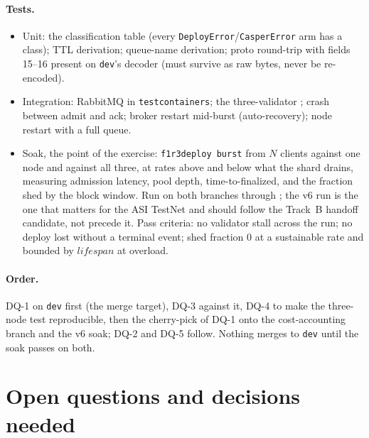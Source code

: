 \documentclass[11pt]{article}
\newcommand{\code}[1]{\texttt{#1}}
\newcommand{\dev}{\code{dev}}
\begin{document}
\paragraph{Tests.}
\begin{itemize}[leftmargin=2em]
  \item Unit: the classification table (every \code{DeployError}/\code{CasperError}
    arm has a class); TTL derivation; queue-name derivation; proto round-trip with
    fields 15--16 present on \dev's decoder (must survive as raw bytes, never be
    re-encoded).
  \item Integration: RabbitMQ in \code{testcontainers}; the three-validator
    ; crash between admit and ack; broker restart mid-burst
    (auto-recovery); node restart with a full queue.
  \item Soak, the point of the exercise: \code{f1r3deploy burst} from $N$ clients
    against one node and against all three, at rates above and below what the shard
    drains, measuring admission latency, pool depth, time-to-finalized, and the
    fraction shed by the block window. Run on both branches through
    ; the v6 run is the one that matters for the ASI
    TestNet and should follow the Track~B handoff candidate, not precede it. Pass
    criteria: no validator stall across the run; no deploy lost without a terminal
    event; shed fraction $0$ at a sustainable rate and bounded by $\mathit{lifespan}$
    at overload.
\end{itemize}

\paragraph{Order.} DQ-1 on \dev{} first (the merge target), DQ-3 against it, DQ-4 to
make the three-node test reproducible, then the cherry-pick of DQ-1 onto the
cost-accounting branch and the v6 soak; DQ-2 and DQ-5 follow. Nothing merges to \dev{}
until the soak passes on both.

\section{Open questions and decisions needed}
\label{sec:open}
\end{document}
